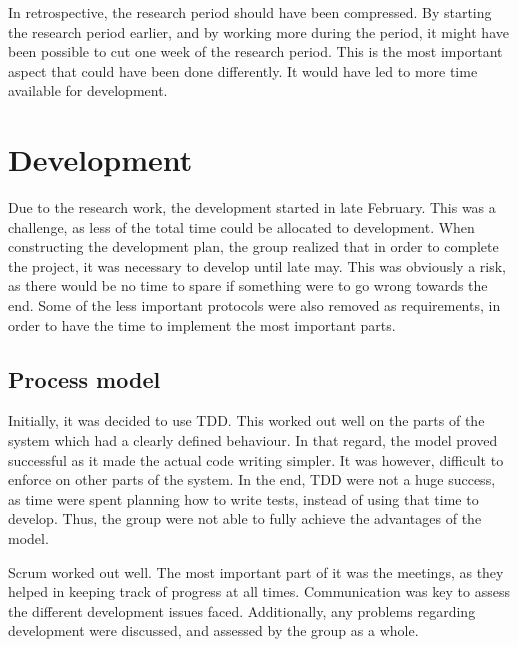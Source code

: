 In retrospective, the research period should have been compressed. By starting the research period earlier, and by working more during the period, it might have been possible to cut one week of the research period. This is the most important aspect that could have been done differently. It would have led to more time available for development.

\section{Development}
\label{sec:project_evaluation-development}

Due to the research work, the development started in late February. This was a challenge, as less of the total time could be allocated to development. When constructing the development plan, the group realized that in order to complete the project, it was necessary to develop until late may. This was obviously a risk, as there would be no time to spare if something were to go wrong towards the end. Some of the less important protocols were also removed as requirements, in order to have the time to implement the most important parts.

\subsection{Process model}
\label{subsec:project_evaluation-development-process_model}

Initially, it was decided to use TDD. This worked out well on the parts of the system which had a clearly defined behaviour. In that regard, the model proved successful as it made the actual code writing simpler. It was however, difficult to enforce on other parts of the system. In the end, TDD were not a huge success, as time were spent planning how to write tests, instead of using that time to develop. Thus, the group were not able to fully achieve the advantages of the model. 

Scrum worked out well. The most important part of it was the meetings, as they helped in keeping track of progress at all times. Communication was key to assess the different development issues faced. Additionally, any problems regarding development were discussed, and assessed by the group as a whole. 

